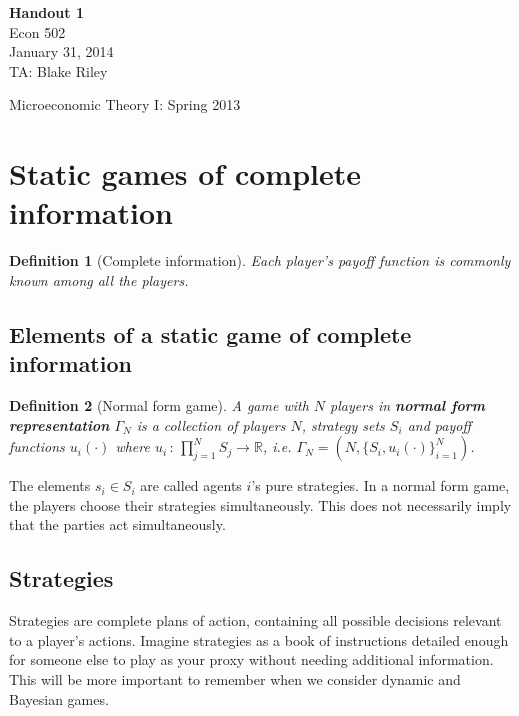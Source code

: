 \documentclass[letter, 10pt]{article}
\theoremstyle{basic}
\newtheorem{definition}{Definition}[section]
\newcommand{\R}{\mathbb{R}}
\begin{document}
\begin{spacing}{1.1}

\noindent
\textbf{Handout 1} \\
Econ 502 \\
January 31, 2014 \\
TA: Blake Riley \\

\begin{center}
{\Large Microeconomic Theory I: Spring 2013}
\end{center}

\section{Static games of complete information}

\begin{definition}[Complete information]
  Each player's payoff function is commonly known among all the players.
\end{definition}

\subsection{Elements of a static game of complete
  information}

\begin{definition}[Normal form game]
  A game with $N$ players in \textbf{normal form
    representation} $\Gamma_N$ is a collection of players
    $N$, strategy sets $S_i$ and payoff functions
    $u_i(\cdot)$ where $u_i \,:\, \prod_{j=1}^N S_j \to
    \R$, i.e. $\Gamma_N = \left(N, \{S_i, u_i(\cdot)\}_{i=1}^N\right)$.
\end{definition}

The elements $s_i \in S_i$ are called agents $i$'s pure strategies. In a
normal form game, the players choose their strategies simultaneously. This
does not necessarily imply that the parties act simultaneously.

\subsection{Strategies}

Strategies are complete plans of action, containing all possible decisions
relevant to a player's actions. Imagine strategies as a book of
instructions detailed enough for someone else to play as your proxy without
needing additional information. This will be more important to remember
when we consider dynamic and Bayesian games.


\end{spacing}
\end{document}
